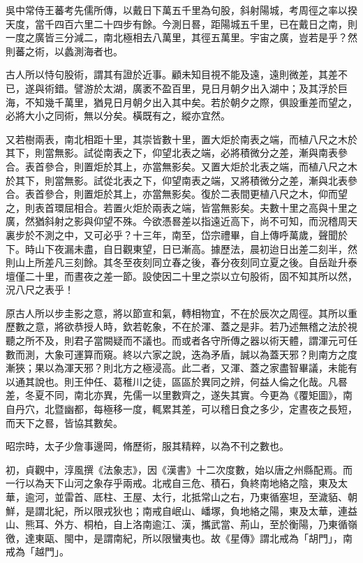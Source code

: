 \begin{pinyinscope}
 吳中常侍王蕃考先儒所傳，以戴日下萬五千里為句股，斜射陽城，考周徑之率以揆天度，當千四百六里二十四步有餘。今測日晷，距陽城五千里，已在戴日之南，則一度之廣皆三分減二，南北極相去八萬里，其徑五萬里。宇宙之廣，豈若是乎？然則蕃之術，以蠡測海者也。



 古人所以恃句股術，謂其有證於近事。顧未知目視不能及遠，遠則微差，其差不已，遂與術錯。譬游於太湖，廣袤不盈百里，見日月朝夕出入湖中；及其浮於巨海，不知幾千萬里，猶見日月朝夕出入其中矣。若於朝夕之際，俱設重差而望之，必將大小之同術，無以分矣。橫既有之，縱亦宜然。



 又若樹兩表，南北相距十里，其崇皆數十里，置大炬於南表之端，而植八尺之木於其下，則當無影。試從南表之下，仰望北表之端，必將積微分之差，漸與南表參合。表首參合，則置炬於其上，亦當無影矣。又置大炬於北表之端，而植八尺之木於其下，則當無影。試從北表之下，仰望南表之端，又將積微分之差，漸與北表參合。表首參合，則置炬於其上，亦當無影矣。復於二表間更植八尺之木，仰而望之，則表首環屈相合。若置火炬於兩表之端，皆當無影矣。夫數十里之高與十里之廣，然猶斜射之影與仰望不殊。今欲憑晷差以指遠近高下，尚不可知，而況稽周天裏步於不測之中，又可必乎？十三年，南至，岱宗禮畢，自上傳呼萬歲，聲聞於下。時山下夜漏未盡，自日觀東望，日已漸高。據歷法，晨初迨日出差二刻半，然則山上所差凡三刻餘。其冬至夜刻同立春之後，春分夜刻同立夏之後。自岳趾升泰壇僅二十里，而晝夜之差一節。設使因二十里之崇以立句股術，固不知其所以然，況八尺之表乎！



 原古人所以步圭影之意，將以節宣和氣，轉相物宜，不在於辰次之周徑。其所以重歷數之意，將欲恭授人時，欽若乾象，不在於渾、蓋之是非。若乃述無稽之法於視聽之所不及，則君子當闕疑而不議也。而或者各守所傳之器以術天體，謂渾元可任數而測，大象可運算而窺。終以六家之說，迭為矛盾，誠以為蓋天邪？則南方之度漸狹；果以為渾天邪？則北方之極浸高。此二者，又渾、蓋之家盡智畢議，未能有以通其說也。則王仲任、葛稚川之徒，區區於異同之辨，何益人倫之化哉。凡晷差，冬夏不同，南北亦異，先儒一以里數齊之，遂失其實。今更為《覆矩圖》，南自丹穴，北暨幽都，每極移一度，輒累其差，可以稽日食之多少，定晝夜之長短，而天下之晷，皆協其數矣。



 昭宗時，太子少詹事邊岡，脩歷術，服其精粹，以為不刊之數也。



 初，貞觀中，淳風撰《法象志》，因《漢書》十二次度數，始以唐之州縣配焉。而一行以為天下山河之象存乎兩戒。北戒自三危、積石，負終南地絡之陰，東及太華，逾河，並雷首、厎柱、王屋、太行，北抵常山之右，乃東循塞坦，至濊貊、朝鮮，是謂北紀，所以限戎狄也；南戒自岷山、嶓塚，負地絡之陽，東及太華，連益山、熊耳、外方、桐柏，自上洛南逾江、漢，攜武當、荊山，至於衡陽，乃東循嶺徼，達東甌、閩中，是謂南紀，所以限蠻夷也。故《星傳》謂北戒為「胡門」，南戒為「越門」。




\end{pinyinscope}
